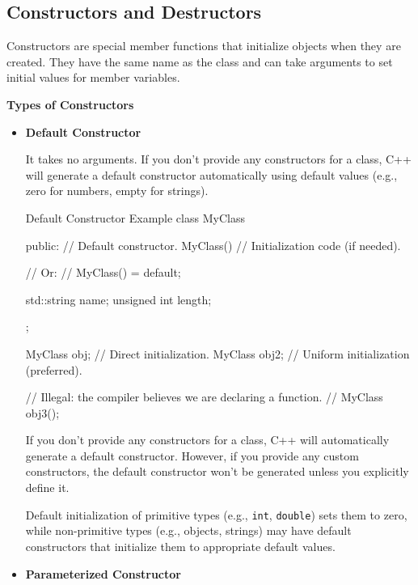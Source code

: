 \subsection{Constructors and Destructors}

Constructors are special member functions that initialize objects when they are created. They have the same name as the class and can take arguments to set initial values for member variables.

\textbf{Types of Constructors}

\begin{itemize}
    \item \textbf{Default Constructor}
    
    It takes no arguments. If you don't provide any constructors for a class, C++ will generate a default constructor automatically using default values (e.g., zero for numbers, empty for strings).
    
    \begin{neonlisting}[language=C++]{Default Constructor Example}
class MyClass {
public:
    // Default constructor.
    MyClass() {
        // Initialization code (if needed).
    }
    
    // Or:
    // MyClass() = default;
    
    std::string name;
    unsigned int length;
};

MyClass obj;    // Direct initialization.
MyClass obj2{}; // Uniform initialization (preferred).

// Illegal: the compiler believes we are declaring a function.
// MyClass obj3();
\end{neonlisting}
    
    \begin{definitionblock}
            
        If you don't provide any constructors for a class, C++ will automatically generate a default constructor. However, if you provide any custom constructors, the default constructor won't be generated unless you explicitly define it.
        
        Default initialization of primitive types (e.g., \texttt{int}, \texttt{double}) sets them to zero, while non-primitive types (e.g., objects, strings) may have default constructors that initialize them to appropriate default values.
    \end{definitionblock}
    
    \item \textbf{Parameterized Constructor}
    

\end{itemize}
